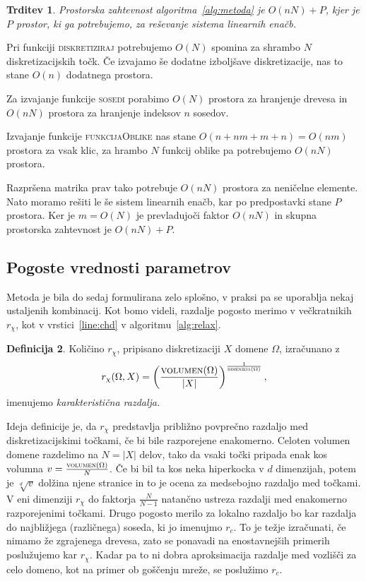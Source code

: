 \documentclass[a4paper,twoside]{article}
\theoremstyle{definition} %
\newtheorem{definicija}{Definicija}[section]
\theoremstyle{plain} %
\newtheorem{trditev}[definicija]{Trditev}
\numberwithin{equation}{section}
\begin{document}
\begin{trditev}
  Prostorska zahtevnost algoritma~\ref{alg:metoda} je $O(nN) + P$, kjer je $P$
  prostor, ki ga potrebujemo, za reševanje sistema linearnih enačb.
\end{trditev}
\proof
Pri funkciji \textsc{diskretiziraj} potrebujemo $O(N)$ spomina za shrambo $N$
diskretizacijskih točk. Če izvajamo še dodatne izboljšave diskretizacije, nas to
stane $O(n)$ dodatnega prostora.

Za izvajanje funkcije \textsc{sosedi} porabimo $O(N)$ prostora za hranjenje drevesa
in $O(nN)$ prostora za hranjenje indeksov $n$ sosedov.

Izvajanje funkcije \textsc{funkcijaOblike} nas stane $O(n+nm+m+n) = O(nm)$
prostora za vsak klic, za hrambo $N$ funkcij oblike pa potrebujemo $O(nN)$
prostora.

Razpršena matrika prav tako potrebuje $O(nN)$ prostora za neničelne elemente.
Nato moramo rešiti le še sistem linearnih enačb, kar po predpostavki stane $P$
prostora. Ker je $m = O(N)$ je prevladujoči faktor $O(nN)$ in skupna prostorska
zahtevnost je $O(nN) + P$.
\endproof

\subsection{Pogoste vrednosti parametrov}
Metoda je bila do sedaj formulirana zelo splošno, v praksi pa se uporablja nekaj
ustaljenih kombinacij. Kot bomo videli, razdalje pogosto merimo v večkratnikih
$r_\chi$, kot v vrstici~\ref{line:chd} v algoritmu~\ref{alg:relax}.
\begin{definicija}
  Količino $r_\chi$, pripisano diskretizaciji $X$ domene $\Omega$, izračunano z \[
    r_\chi(\Omega, X) = \left( \frac{\textsc{volumen}(\Omega)}{|X|}
    \right)^\frac{1}{\textsc{dimenzija}(\Omega)},
  \]
  imenujemo \emph{karakteristična razdalja.}
\end{definicija}
Ideja definicije je, da $r_\chi$ predstavlja približno povprečno razdaljo med
diskretizacijskimi točkami, če bi bile razporejene enakomerno. Celoten volumen
domene razdelimo na $N = |X|$ delov, tako da vsaki točki pripada enak kos
volumna $v = \frac{\textsc{volumen}(\Omega)}{N}$. Če bi
bil ta kos neka hiperkocka v $d$ dimenzijah, potem je $\sqrt[d]{v}$ dolžina
njene stranice in to je ocena za medsebojno razdaljo med točkami.
V eni dimenziji $r_\chi$ do faktorja $\frac{N}{N-1}$ natančno ustreza razdalji
med enakomerno razporejenimi točkami.
Drugo pogosto merilo za lokalno razdaljo bo kar razdalja do najbližjega
(različnega) soseda, ki jo imenujmo $r_c$. To je težje izračunati, če nimamo že
zgrajenega drevesa, zato se ponavadi na enostavnejših primerih poslužujemo kar
$r_\chi$. Kadar pa to ni dobra aproksimacija razdalje med vozlišči za celo
domeno, kot na primer ob goščenju mreže, se poslužimo $r_c$.
\end{document}
